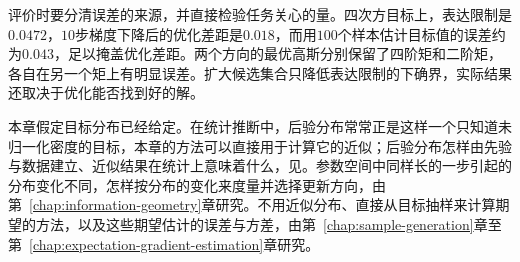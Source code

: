 评价时要分清误差的来源，并直接检验任务关心的量。四次方目标上，表达限制是$0.0472$，$10$步梯度下降后的优化差距是$0.018$，而用$100$个样本估计目标值的误差约为$0.043$，足以掩盖优化差距。两个方向的最优高斯分别保留了四阶矩和二阶矩，各自在另一个矩上有明显误差。扩大候选集合只降低表达限制的下确界，实际结果还取决于优化能否找到好的解。

本章假定目标分布已经给定。在统计推断中，后验分布常常正是这样一个只知道未归一化密度的目标，本章的方法可以直接用于计算它的近似；后验分布怎样由先验与数据建立、近似结果在统计上意味着什么，见。参数空间中同样长的一步引起的分布变化不同，怎样按分布的变化来度量并选择更新方向，由第~\ref{chap:information-geometry}章研究。不用近似分布、直接从目标抽样来计算期望的方法，以及这些期望估计的误差与方差，由第~\ref{chap:sample-generation}章至第~\ref{chap:expectation-gradient-estimation}章研究。
